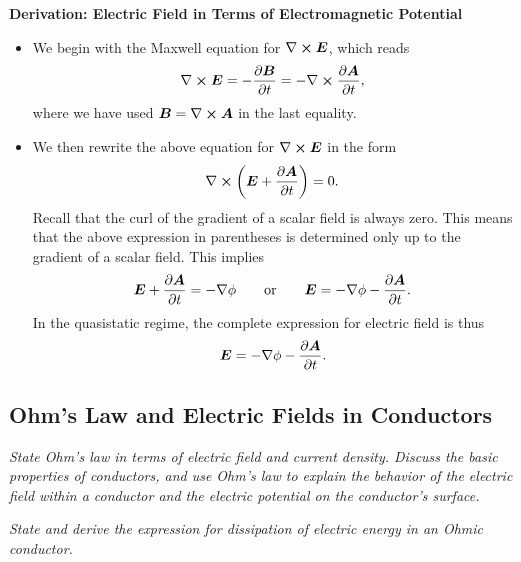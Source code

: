 \documentclass[11pt, a4paper]{article}
\renewcommand{\vec}[1]{\bm{#1}} %
\newcommand{\E}{\vec{E}} %
\newcommand{\B}{\vec{B}} %
\newcommand{\A}{\vec{A}} %
\renewcommand{\curl}{\nabla \cross}
\renewcommand{\grad}{\nabla}
\begin{document}
\textbf{Derivation: Electric Field in Terms of Electromagnetic Potential}
\begin{itemize}

    \item We begin with the Maxwell equation for $ \curl \E $, which reads
    \begin{equation*}
		\curl \E = - \pdv{\B}{t} = - \curl \pdv{\A}{t},
	\end{equation*}
    where we have used $ \B = \curl \A $ in the last equality.

    \item We then rewrite the above equation for $ \curl \E $ in the form
	\begin{equation*}
		\curl \left(\E + \pdv{\A}{t}\right) = 0.
	\end{equation*}
	Recall that the curl of the gradient of a scalar field is always zero. This means that the above expression in parentheses is determined only up to the gradient of a scalar field. This implies
	\begin{equation*}
        \E + \pdv{\A}{t} = - \grad \phi \qquad \text{or} \qquad \E = - \grad \phi - \pdv{\A}{t}.
	\end{equation*} 
	In the quasistatic regime, the complete expression for electric field is thus
	\begin{equation*}
		\E = - \grad \phi - \pdv{\A}{t}.
	\end{equation*}
	
\end{itemize}
    

\subsection{Ohm's Law and Electric Fields in Conductors}
\textit{State Ohm's law in terms of electric field and current density. Discuss the basic properties of conductors, and use Ohm's law to explain the behavior of the electric field within a conductor and the electric potential on the conductor's surface.}

\vspace{2mm}
\textit{State and derive the expression for dissipation of electric energy in an Ohmic conductor.}
\end{document}
